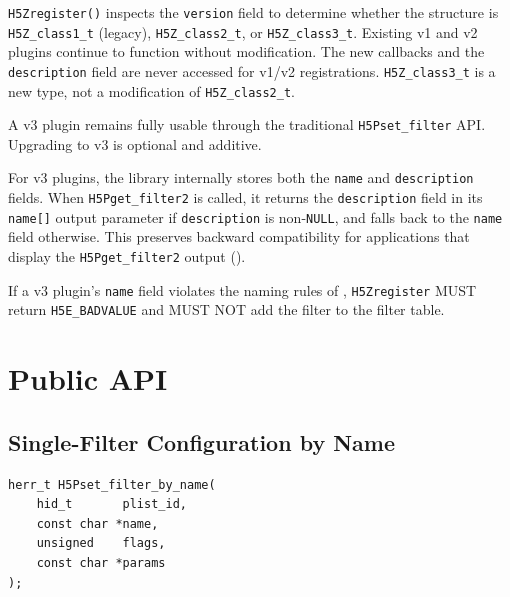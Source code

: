 \documentclass[../HDF5_RFC.tex]{subfiles}
\begin{document}
\texttt{H5Zregister()} inspects the \texttt{version} field to determine whether the
structure is \texttt{H5Z\_class1\_t} (legacy), \texttt{H5Z\_class2\_t}, or
\texttt{H5Z\_class3\_t}. Existing v1 and v2 plugins continue to function without
modification. The new callbacks and the \texttt{description} field are never
accessed for v1/v2 registrations.
\texttt{H5Z\_class3\_t} is a new type, not a modification of \texttt{H5Z\_class2\_t}.

A v3 plugin remains fully usable through the traditional \texttt{H5Pset\_filter} API.
Upgrading to v3 is optional and additive.

For v3 plugins, the library internally stores both the \texttt{name} and
\texttt{description} fields. When \texttt{H5Pget\_filter2} is called, it returns
the \texttt{description} field in its \texttt{name[]} output parameter if
\texttt{description} is non-\texttt{NULL}, and falls back to the \texttt{name} field
otherwise. This preserves backward compatibility for applications that display
the \texttt{H5Pget\_filter2} output ().

If a v3 plugin's \texttt{name} field violates the naming rules of
, \texttt{H5Zregister} MUST return
\texttt{H5E\_BADVALUE} and MUST NOT add the filter to the filter table.


\section{Public API}
\label{sec:public-api}

\subsection{Single-Filter Configuration by Name}
\label{sec:set-filter-by-name}

\begin{verbatim}
herr_t H5Pset_filter_by_name(
    hid_t       plist_id,
    const char *name,
    unsigned    flags,
    const char *params
);
\end{verbatim}
\end{document}
